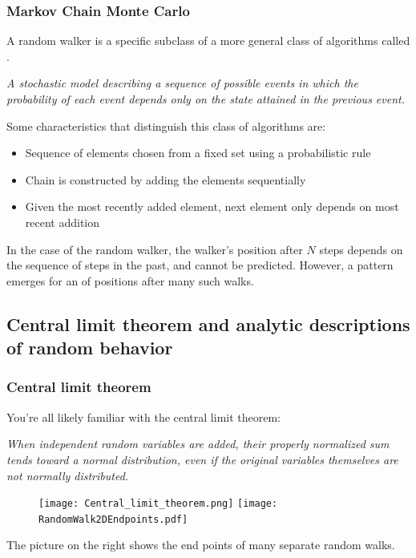 \documentclass[hyperref={colorlinks=true}]{beamer}
\begin{document}
\begin{frame}%
  \frametitle{Markov Chain Monte Carlo}
  
  A random walker is a specific subclass of a more general class of algorithms called . 
  
  \begin{center}
    \textit{A stochastic model describing a sequence of possible events in which the probability of each event depends only on the state attained in the previous event.}
  \end{center}
  
  \vspace{0.2cm} 
  
  Some characteristics that distinguish this class of algorithms are:   
  
  \begin{itemize}
    \item Sequence of elements chosen from a fixed set using a probabilistic rule
    \item Chain is constructed by adding the elements sequentially
    \item Given the most recently added element, next element only depends on most recent addition
  \end{itemize}
  
  In the case of the random walker, the walker's position after $N$ steps depends on the sequence of steps in the past, and cannot be predicted. However, a pattern emerges for an  of positions after many such walks.
  
\end{frame}

\subsection[Central limit theorem and analytic descriptions of random behavior]{Central limit theorem and analytic descriptions of random behavior}

\begin{frame}%
  \frametitle{Central limit theorem}
  
  You're all likely familiar with the central limit theorem:
  
  \begin{center}
    \textit{When independent random variables are added, their properly normalized sum tends toward a normal distribution, even if the original variables themselves are not normally distributed.}
  \end{center}
  
  \begin{figure}
    \centering
    \texttt{[image: Central\_limit\_theorem.png]}
    \texttt{[image: RandomWalk2DEndpoints.pdf]}
  \end{figure}
  
  The picture on the right shows the end points of many separate random walks.
  
\end{frame}
\end{document}
